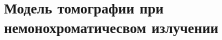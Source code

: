 \begin{comment}
Тогда интенсивность излуче-
ния вдоль некоторого бесконечно тонкого луча со сдвигом s, %
 после про-
хождения через объект будет
Для краткости записи далее аргументы угла и сдвига, задающие прямую %

будут опускаться. Данные значения подвергаются нормировке и логарифмиро-
ванию, в результате восстанавливается распределение линейного коэффициента
ослабления для энергии зондирующего излучения, путем решения системы
уравнений:
для всех углов измерения %
 и сдвигов s. Оператор интегрирования вдоль всех
возможных направлений называется преобразованием Радона. При восстановлении реальных измерений как входные данные%
так и искомая характе-
ристика f(x, y) представляются дискретными изображениями размеров 
соответственно, а преобразование Радона заменяется на преобра-
зование Хафа.
Для восстановления распределения линейного коэффициента ослабления ис-
пользуются в основном интегральные или алгебраические методы [4]. Особый
интерес представляют последние, так как их, как будет показано ниже, можно
использовать и для восстановления экспериментов, проводимых с использова-
нием немонохроматического пучка. Пусть 
– соответ-
ственно входные и выходные данные, H – матрица линейного преобразования
Хафа размера 
 . Тогда томографическую проекцию можно записать
в виде СЛАУ
Решение этой СЛАУ методом наименьших квадратов в явном виде невозможно
ввиду огромного размера матрицы H, однако ее умножение на вектор f, как и
умножение транспонированной матрицы H T может быть посчитано быстро за
O(N 2 log N) используя методы обработки изображений [5]. Применяя метод
градиентного спуска для минимизации L2 нормы расхождения, получаем шаг
градиентного спуска
\end{comment}

\section{Модель томографии при немонохроматичесвом излучении}

